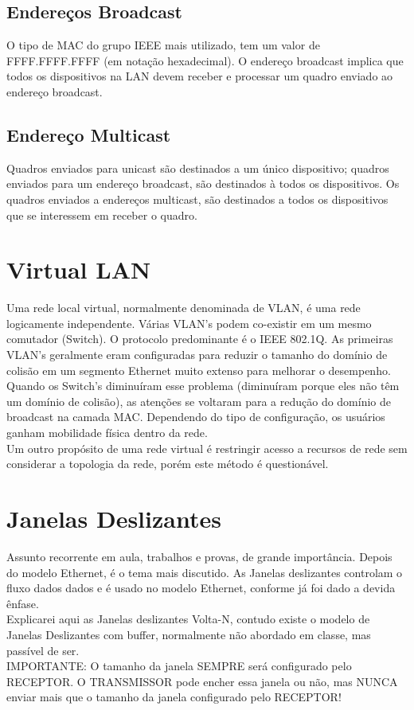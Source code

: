 \documentclass{article}
\begin{document}
\subsection{Endereços Broadcast}
O tipo de MAC do grupo IEEE mais utilizado, tem um valor de FFFF.FFFF.FFFF (em notação hexadecimal). O endereço broadcast implica que todos os dispositivos na LAN devem receber e processar um quadro enviado ao endereço broadcast.

\subsection{Endereço Multicast} Quadros enviados para unicast são destinados a um único dispositivo; quadros enviados para um endereço broadcast, são destinados à todos os dispositivos. Os quadros enviados a endereços multicast, são destinados a todos os dispositivos que se interessem em receber o quadro.

\section{Virtual LAN}
Uma rede local virtual, normalmente denominada de VLAN, é uma rede logicamente
independente. Várias VLAN's podem co-existir em um mesmo comutador (Switch). O
protocolo predominante é o IEEE 802.1Q. As primeiras VLAN's geralmente eram
configuradas para reduzir o tamanho do domínio de colisão em um segmento
Ethernet muito extenso para melhorar o desempenho. Quando os Switch's
diminuíram esse problema (diminuíram porque eles não têm um domínio de colisão), as
atenções se voltaram para a redução do domínio de broadcast na camada MAC.
Dependendo do tipo de configuração, os usuários ganham mobilidade física dentro
da rede.\\ Um outro propósito de uma rede virtual é restringir acesso a recursos
de rede sem considerar a topologia da rede, porém este método é questionável.

\section{Janelas Deslizantes}
Assunto recorrente em aula, trabalhos e provas, de grande importância. Depois do modelo Ethernet, é o tema mais discutido. As Janelas deslizantes controlam o fluxo dados dados e é usado no modelo Ethernet, conforme já foi dado a devida ênfase.\\ Explicarei aqui as Janelas deslizantes Volta-N, contudo existe o modelo de Janelas Deslizantes com buffer, normalmente não abordado em classe, mas passível de ser.\\ IMPORTANTE: O tamanho da janela SEMPRE será configurado pelo RECEPTOR. O TRANSMISSOR pode encher essa janela ou não, mas NUNCA enviar mais que o tamanho da janela configurado pelo RECEPTOR!
\end{document}
